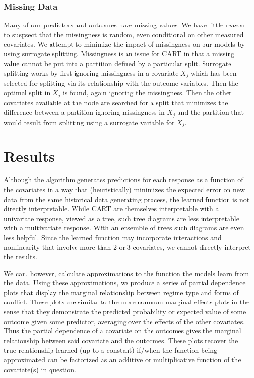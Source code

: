 \documentclass[titlepage, onecolumn,12pt]{article}
\begin{document}
\subsubsection{Missing Data}

Many of our predictors and outcomes have missing values. We have little reason to suspsect that the missingness is random, even conditional on other measured covariates. We attempt to minimize the impact of missingness on our models by using surrogate splitting. Missingness is an issue for CART in that a missing value cannot be put into a partition defined by a particular split. Surrogate splitting works by first ignoring missingness in a covariate $X_j$ which has been selected for splitting via its relationship with the outcome variables. Then the optimal split in $X_j$ is found, again ignoring the missingness. Then the other covariates available at the node are searched for a split that minimizes the difference between a partition ignoring missingness in $X_j$ and the partition that would result from splitting using a surrogate variable for $X_j$.


\section{Results}

Although the algorithm generates predictions for each response as a function of the covariates in a way that (heuristically) minimizes the expected error on new data from the same historical data generating process, the learned function is not directly interpretable. While CART are themselves interpretable with a univariate response, viewed as a tree, such tree diagrams are less interpretable with a multivariate response. With an ensemble of trees such diagrams are even less helpful. Since the learned function may incorporate interactions and nonlinearity that involve more than 2 or 3 covariates, we cannot directly interpret the results.

We can, however, calculate approximations to the function the models learn from the data. Using these approximations, we produce a series of partial dependence plots that display the marginal relationship between regime type and forms of conflict. These plots are similar to the more common marginal effects plots in the sense that they demonstrate the predicted probability or expected value of some outcome given some predictor, averaging over the effects of the other covariates. Thus the partial dependence of a covariate on the outcomes gives the marginal relationship between said covariate and the outcomes. These plots recover the true relationship learned (up to a constant) if/when the function being approximated can be factorized as an additive or multiplicative function of the covariate(s) in question.
\end{document}

